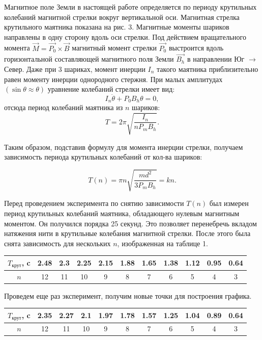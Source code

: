 Магнитное поле Земли в настоящей работе определяется по периоду крутильных колебаний
магнитной стрелки вокруг вертикальной оси. 
Магнитная стрелка крутильного маятника показана на рис. 3.
 Магнитные моменты шариков направлены в одну
сторону вдоль оси стрелки. Под действием вращательного
момента $\vec{M} = \vec{P_0} \times\vec{B}$ магнитный момент стрелки $\vec{P_0}$ выстроится вдоль горизонтальной составляющей магнитного поля Земли $\vec{B_h}$ в направлении Юг $\longrightarrow$ Север. 
Даже при 3 шариках, момент инерции $I_n$ такого маятника приблизительно равен моменту инерции однородного стержня. При малых амплитудах $(\sin\theta\approx\theta)$ уравнение колебаний стрелки имеет вид:
\[I_n\ddot{\theta} + P_0B_h\theta=0,\]
отсюда период колебаний маятника из $n$ шариков:
\[T = 2\pi\sqrt{\frac{I_n}{nP_mB_h}}.\]

Таким образом, подставив формулу для момента инерции стрелки, получаем  зависимость периода крутильных колебаний от кол-ва шариков:

\begin{equation}
T(n) = \pi n\sqrt{\frac{md^2}{3P_mB_h}} = kn.
\end{equation}

Перед проведением эксперимента по снятию зависимости $T(n)$ был измерен период крутильных колебаний маятника, обладающего нулевым магнитным моментом. Он получился порядка 25 секунд. Это позволяет перенебречь вкладом натяжения нити в крутильные колебания магнитной стрелки. После этого была снята зависимость для нескольких $n$, изображенная на таблице 1.
\begin{table}[h!]
\begin{center}
\begin{tabular}{|c|c|c|c|c|c|c|c|c|c|c|}
\hline
\rowcolor[HTML]{9698ED} 
$T_{\text{крут}}$, c & 2.48 &  2.3 & 2.25 & 2.15 & 1.88 & 1.65 & 1.38 & 1.12 & 0.95 & 0.64 \\ \hline
$n$                  & 12   & 11   & 10    & 9   & 8    & 7    & 6    & 5    & 4    & 3    \\ \hline
\end{tabular}
\end{center}
\end{table}

Проведем еще раз эксперимент, получим новые точки для построения графика.

\begin{table}[h!]
\begin{center}
\begin{tabular}{|c|c|c|c|c|c|c|c|c|c|c|}
\hline
\rowcolor[HTML]{9698ED} 
$T_{\text{крут}}$, c & 2.35 &  2.27 & 2.1 & 1.97 & 1.78 & 1.57 & 1.25 & 1.04 & 0.89 & 0.64 \\ \hline
$n$                  & 12   & 11   & 10    & 9   & 8    & 7    & 6    & 5    & 4    & 3    \\ \hline
\end{tabular}
\end{center}
\end{table}

